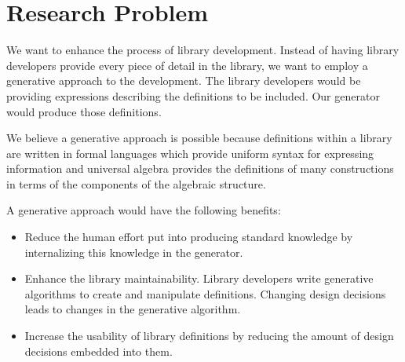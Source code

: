 \section{Research Problem}
\label{sec:questions}


We want to enhance the process of library development. Instead of having library developers provide every piece of detail in the library, we want to employ a generative approach to the development. The library developers would be providing expressions describing the definitions to be included. 
Our generator would produce those definitions. 

We believe a generative approach is possible because definitions within a library are written in formal languages which provide uniform syntax for expressing information and universal algebra provides the definitions of many constructions in terms of the components of the algebraic structure. 

 A generative approach would have the following benefits: 
\begin{itemize}
    \item Reduce the human effort put into producing standard knowledge by internalizing this knowledge in the generator.
    \item Enhance the library maintainability. Library developers write generative algorithms to create and manipulate definitions. Changing design decisions leads to changes in the generative algorithm. 
    \item Increase the usability of library definitions by reducing the amount of design decisions embedded into them. 
\end{itemize}  


